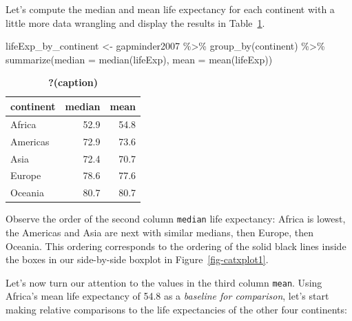\documentclass[
  letterpaper,
  DIV=11,
  numbers=noendperiod]{scrreprt}
\newenvironment{Shaded}{\begin{snugshade}}{\end{snugshade}}
\newcommand{\AttributeTok}[1]{\textcolor[rgb]{0.40,0.45,0.13}{#1}}
\newcommand{\FunctionTok}[1]{\textcolor[rgb]{0.28,0.35,0.67}{#1}}
\newcommand{\NormalTok}[1]{\textcolor[rgb]{0.00,0.23,0.31}{#1}}
\newcommand{\OtherTok}[1]{\textcolor[rgb]{0.00,0.23,0.31}{#1}}
\newcommand{\SpecialCharTok}[1]{\textcolor[rgb]{0.37,0.37,0.37}{#1}}
\theoremstyle{definition}
\theoremstyle{remark}
\begin{document}
Let's compute the median and mean life expectancy for each continent
with a little more data wrangling and display the results in
Table~\ref{tbl-catxplot0}.

\begin{Shaded}
\begin{Highlighting}[]
\NormalTok{lifeExp\_by\_continent }\OtherTok{\textless{}{-}}\NormalTok{ gapminder2007 }\SpecialCharTok{\%\textgreater{}\%}
  \FunctionTok{group\_by}\NormalTok{(continent) }\SpecialCharTok{\%\textgreater{}\%}
  \FunctionTok{summarize}\NormalTok{(}\AttributeTok{median =} \FunctionTok{median}\NormalTok{(lifeExp), }\AttributeTok{mean =} \FunctionTok{mean}\NormalTok{(lifeExp))}
\end{Highlighting}
\end{Shaded}

\begin{table}

\caption{\label{tbl-catxplot0}\textbf{?(caption)}}\begin{minipage}[t]{\linewidth}

{\centering 

\begin{tabular}[t]{lrr}
\toprule
continent & median & mean\\
\midrule
Africa & 52.9 & 54.8\\
Americas & 72.9 & 73.6\\
Asia & 72.4 & 70.7\\
Europe & 78.6 & 77.6\\
Oceania & 80.7 & 80.7\\
\bottomrule
\end{tabular}

}

\end{minipage}%

\end{table}

Observe the order of the second column \texttt{median} life expectancy:
Africa is lowest, the Americas and Asia are next with similar medians,
then Europe, then Oceania. This ordering corresponds to the ordering of
the solid black lines inside the boxes in our side-by-side boxplot in
Figure~\ref{fig-catxplot1}.

Let's now turn our attention to the values in the third column
\texttt{mean}. Using Africa's mean life expectancy of 54.8 as a
\emph{baseline for comparison}, let's start making relative comparisons
to the life expectancies of the other four continents:
\end{document}
